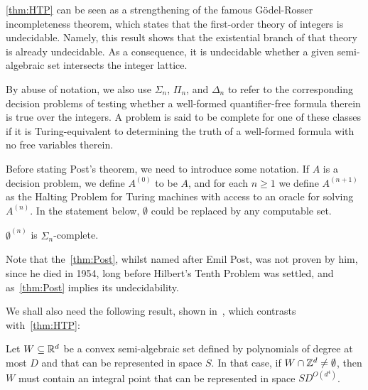 \cref{thm:HTP} can be seen as a strengthening of the famous G\"{o}del-Rosser incompleteness theorem, which states that the first-order theory of integers is undecidable. Namely, this result shows that the existential branch of that theory is already undecidable. As a consequence, it is undecidable whether a given semi-algebraic set intersects the integer lattice.

By abuse of notation, we also use $\Sigma_{n}$, $\Pi_{n}$, and $\Delta_{n}$ to refer to the corresponding decision problems of testing whether a well-formed quantifier-free formula therein is true over the integers. A problem is said to be complete for one of these classes if it is Turing-equivalent to determining the truth of a well-formed formula with no free variables therein.

Before stating Post's theorem, we need to introduce some notation. If $A$ is a decision problem, we define $A^{(0)}$ to be $A$, and for each $n \geq 1$ we define $A^{(n+1)}$ as the Halting Problem for Turing machines with access to an oracle for solving $A^{(n)}$. In the statement below, $\emptyset$ could be replaced by any computable set.

\begin{theorem}[Post]
\label{thm:Post}
$\emptyset^{(n)}$ is $\Sigma_{n}$-complete.
\end{theorem}

Note that the~\cref{thm:Post}, whilst named after Emil Post, was not proven by him, since he died in 1954, long before Hilbert's Tenth Problem was settled, and as~\cref{thm:Post} implies its undecidability.

We shall also need the following result, shown in~\cite{KhachiyanP97}, which contrasts with~\cref{thm:HTP}:
\begin{theorem}
\label{thm:kp}
Let $W\subseteq\mathbb{R}^{d}$ be a convex semi-algebraic set defined by
polynomials of degree at most $D$ and that can be represented in space
$S$. In that case, if $W\cap\mathbb{Z}^{d}\neq\emptyset$, then $W$ must
contain an integral point that can be represented in space
$SD^{O(d^4)}$.
\end{theorem}
